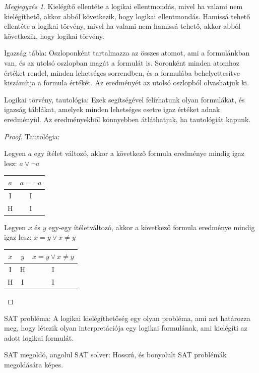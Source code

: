 \documentclass[
]{thesis-ekf}
\theoremstyle{definition}
\theoremstyle{remark}
\newtheorem{megjegyzes}[tetel]{Megjegyzés}
\begin{document}
	\begin{megjegyzes}
		Kielégítő ellentéte a logikai ellentmondás, mivel ha valami nem kielégíthető, akkor abból következik, hogy logikai ellentmondás.
		Hamissá tehető ellentéte a logikai törvény, mivel ha valami nem hamissá tehető, akkor abból következik, hogy logikai törvény.
	\end{megjegyzes}

	Igazság tábla: Oszloponként tartalmazza az összes atomot, ami a formulánkban van, és az utolsó oszlopban magát a formulát is. Soronként minden atomhoz értéket rendel, minden lehetséges sorrendben, és a formulába behelyettesítve kiszámítja a formula értékét. Az eredményét az utolsó oszlopból olvashatjuk ki.
	
	Logikai törvény, tautológia: Ezek segítségével felírhatunk olyan formulákat, és igazság táblákat, amelyek minden lehetséges esetre igaz értéket adnak eredményül. Az eredményekből könnyebben átláthatjuk, ha tautológiát kapunk.
	
	\begin{proof}\label{biz-tautologia}
		Tautológia: 
			
		Legyen $ a $ egy ítélet változó, akkor a következő formula eredménye mindig igaz lesz: $ a\vee\neg a $
		
		\begin{tabular}{|c|c|}
			\hline
			$ a $ & $ a=\neg a $ \\
			\hline
			I & I \\
			\hline
			H & I \\
			\hline
		\end{tabular}
	
		Legyen $ x $ és $ y $ egy-egy ítéletváltozó, akkor a következő formula eredménye mindig igaz lesz: $ x=y\vee x\ne y $
		
		\begin{tabular}{|c|c|c|}
			\hline
			$ x $ & $ y $ & $ x=y\vee x\ne y $ \\
			\hline
			I & H & I \\
			\hline
			H & I & I \\
			\hline
		\end{tabular}
	\end{proof}
	
	\textsc{SAT} probléma: A logikai kielégíthetőség egy olyan probléma, ami azt határozza meg, hogy létezik olyan interpretációja egy logikai formulának, ami kielégíti az adott logikai formulát.
	
	\textsc{SAT} megoldó, angolul \textsc{SAT} solver: Hosszú, és bonyolult \textsc{SAT} problémák megoldására képes. %
\end{document}
